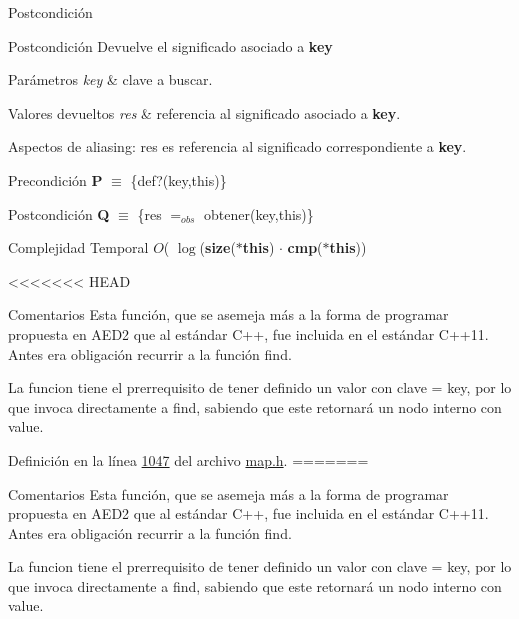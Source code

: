 \begin{DoxyPostcond}{\-Postcondición}
\begin{DoxyPostcond}{\-Postcondición}
Devuelve el significado asociado a {\bfseries key} 


\begin{DoxyParams}{Parámetros}
{\em key} & clave a buscar. \\
\hline
\end{DoxyParams}

\begin{DoxyRetVals}{Valores devueltos}
{\em res} & referencia al significado asociado a {\bfseries key}.\\
\hline
\end{DoxyRetVals}
\begin{DoxyParagraph}{Aspectos de aliasing\+:}
res es referencia al significado correspondiente a {\bfseries key}.
\end{DoxyParagraph}
\begin{DoxyPrecond}{Precondición}
{\bfseries P} $\equiv$ \{def?(key,this)\}
\end{DoxyPrecond}
\begin{DoxyPostcond}{Postcondición}
{\bfseries Q} $\equiv$ \{res $=_{obs}$ obtener(key,this)\}
\end{DoxyPostcond}

\begin{DoxyDescription}
\item[Complejidad Temporal]$O$( $\log$({\bfseries size}({\bfseries $\ast$this}) $\cdot$ {\bfseries cmp}({\bfseries $\ast$this}))
\end{DoxyDescription}

<<<<<<< HEAD
\begin{DoxyRemark}{\-Comentarios}
\-Esta función, que se asemeja más a la forma de programar propuesta en \-A\-E\-D2 que al estándar \-C++, fue incluida en el estándar \-C++11. \-Antes era obligación recurrir a la función find.
\end{DoxyRemark}
\-La funcion tiene el prerrequisito de tener definido un valor con clave = key, por lo que invoca directamente a find, sabiendo que este retornará un nodo interno con value. 

\-Definición en la línea \hyperlink{map_8h_source_l01047}{1047} del archivo \hyperlink{map_8h_source}{map.\-h}.
=======
\begin{DoxyRemark}{Comentarios}
Esta función, que se asemeja más a la forma de programar propuesta en A\+E\+D2 que al estándar C++, fue incluida en el estándar C++11. Antes era obligación recurrir a la función find.
\end{DoxyRemark}
La funcion tiene el prerrequisito de tener definido un valor con clave = key, por lo que invoca directamente a find, sabiendo que este retornará un nodo interno con value. 


\end{DoxyPostcond}
\end{DoxyPostcond}
